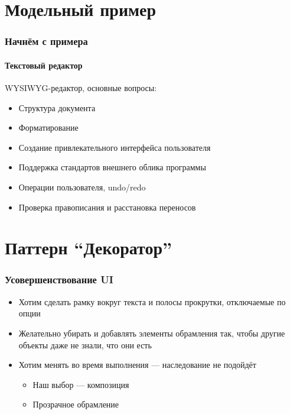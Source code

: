 \documentclass{../../slides-style}
\begin{document}
    \section{Модельный пример}

    \begin{frame}
        \frametitle{Начнём с примера}
        \framesubtitle{Текстовый редактор}
        WYSIWYG-редактор, основные вопросы:
        \begin{itemize}
            \item Структура документа
            \item Форматирование
            \item Создание привлекательного интерфейса пользователя
            \item Поддержка стандартов внешнего облика программы
            \item Операции пользователя, undo/redo
            \item Проверка правописания и расстановка переносов
        \end{itemize}
    \end{frame}

    \section{Паттерн ``Декоратор''}

    \begin{frame}
        \frametitle{Усовершенствование UI}
        \begin{itemize}
            \item Хотим сделать рамку вокруг текста и полосы прокрутки, отключаемые по опции
            \item Желательно убирать и добавлять элементы обрамления так, чтобы другие объекты даже не знали, что они есть
            \item Хотим менять во время выполнения --- наследование не подойдёт
            \begin{itemize}
                \item Наш выбор ­--- композиция
                \item Прозрачное обрамление
            \end{itemize}
        \end{itemize}
    \end{frame}
\end{document}
